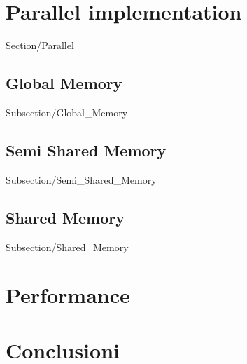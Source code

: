 \documentclass[12pt,a4paper,titlepage]{article}
\begin{document}
\newpage
\section{Parallel implementation}
 {Section/Parallel}

\subsection{Global Memory}
 {Subsection/Global_Memory}

\subsection{Semi Shared Memory}
 {Subsection/Semi_Shared_Memory}	

\subsection{Shared Memory}
 {Subsection/Shared_Memory}

\newpage
\section{Performance}


\newpage
\section{Conclusioni}


\newpage

\nocite{*}
\printbibliography
\end{document}
